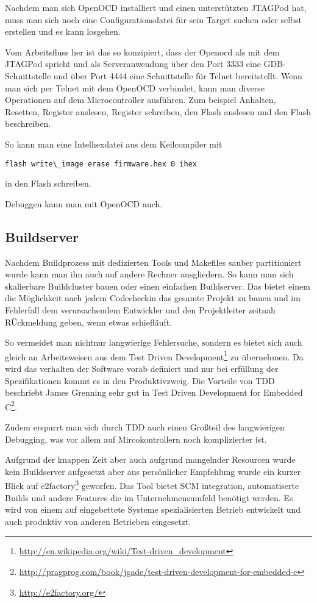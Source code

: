 Nachdem man sich OpenOCD installiert und einen unterstützten JTAGPod hat, muss man sich noch eine Configurationsdatei für sein Target suchen oder selbst erstellen und es kann losgehen.


Vom Arbeitsfluss her ist das so konzipiert, dass der Openocd als mit dem JTAGPod spricht und als Serveranwendung über den Port 3333 eine GDB-Schnittstelle und über Port 4444 eine Schnittstelle für Telnet bereitstellt.
Wenn man sich per Telnet mit dem OpenOCD verbindet, kann man diverse Operationen auf dem Microcontroller ausführen. Zum beispiel Anhalten, Resetten, Register auslesen, Register schreiben, den Flash auslesen und den Flash beschreiben.

So kann man eine Intelhexdatei aus dem Keilcompiler mit \begin{verbatim}flash write\_image erase firmware.hex 0 ihex
\end{verbatim} 
in den Flash schreiben.


Debuggen kann man mit OpenOCD auch.

\subsection{Buildserver}

Nachdem Buildprozess mit dedizierten Tools und Makefiles sauber partitioniert wurde kann man ihn auch auf andere Rechner ausgliedern. So kann man sich skalierbare Buildcluster bauen oder einen einfachen Buildserver. Das bietet einem die Möglichkeit nach jedem Codecheckin das gesamte Projekt zu bauen und im Fehlerfall dem verursachendem Entwickler und den Projektleiter zeitnah RÜckmeldung geben, wenn etwas schiefläuft.

So vermeidet man nichtnur langwierige Fehlersuche, sondern es bietet sich auch gleich an Arbeitsweisen aus dem Test Driven Development\footnote{\url{http://en.wikipedia.org/wiki/Test-driven_development}} zu übernehmen. Da wird das verhalten der Software vorab definiert und nur bei erfüllung der Spezifikationen kommt es in den Produktivzweig. Die Vorteile von TDD beschriebt James Grenning sehr gut in Test Driven Development for Embedded C\footnote{\url{http://pragprog.com/book/jgade/test-driven-development-for-embedded-c}}. 


Zudem ersparrt man sich durch TDD auch einen Großteil des langwierigen Debugging, was vor allem auf Mircokontrollern noch komplizierter ist.


Aufgrund der knappen Zeit aber auch aufgrund mangelnder Resourcen wurde kein Buildserver aufgesetzt aber aus persönlicher Empfehlung wurde ein kurzer Blick auf e2factory\footnote{\url{http://e2factory.org/}} geworfen. Das Tool bietet SCM integration, automatiserte Builds und andere Features die im Unternehmensumfeld benötigt werden.
Es wird von einem auf eingebettete Systeme spezialisierten Betrieb entwickelt und auch produktiv von anderen Betrieben eingesetzt.


